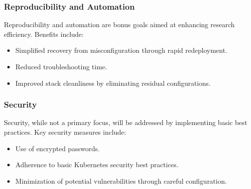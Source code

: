 \subsubsection{Reproducibility and Automation}

Reproducibility and automation are bonus goals aimed at enhancing research efficiency. Benefits include:
\begin{itemize}
\item Simplified recovery from misconfiguration through rapid redeployment.
\item Reduced troubleshooting time.
\item Improved stack cleanliness by eliminating residual configurations.
\end{itemize}

\subsubsection{Security}

Security, while not a primary focus, will be addressed by implementing basic best practices. Key security measures include:
\begin{itemize}
\item Use of encrypted passwords.
\item Adherence to basic Kubernetes security best practices.
\item Minimization of potential vulnerabilities through careful configuration.
\end{itemize}


